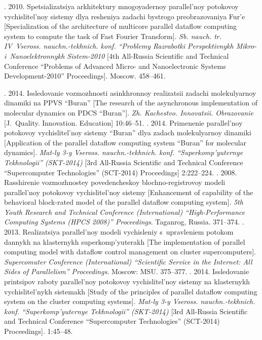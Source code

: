 \begin{multicols}{2}
{{\begin{thebibliography}{99}
  . 2010. Spetsia\-li\-za\-tsiya arkhitektury 
mnogoyadernoy parallel'noy potokovoy vychislitel'noy sistemy dlya resheniya 
zadachi bystrogo preobrazovaniya Fur'e [Specialization of the architecture of 
multicore parallel dataflow computing system to compute the task of Fast Fourier 
Transform]. \textit{Sb. nauch. tr. IV~Vseross. nauchn.-tekhnich. konf. ``Problemy 
Razrabotki Perspektivnykh Mikro- i~Nanoelektronnykh Sistem-2010} [4th  
All-Russia Scientific and Technical Conference ``Problems of Advanced Micro- and 
Nanoelectronic Systems Development-2010'' Proceedings]. Moscow. 458--461.

  . 2014. Issledovanie vozmozhnosti asinkhronnoy realizatsii 
zadachi mo\-le\-ku\-lyar\-noy dinamiki na PPVS ``Buran'' [The research of the 
asynchronous implementation of molecular dynamics on PDCS ``Buran'']. \textit{Zh. 
Kachestvo. Innovatsii. Obrazovanie} [J.~Quality. Innovation. Education] 10:46--51.
  . 
2014. Primenenie parallel'noy potokovoy vychislitel'noy sistemy ``Buran'' dlya 
zadach moleku\-lyar\-noy dinamiki [Application of the parallel dataflow computing 
system ``Buran'' for molecular dynamics]. \textit{Mat-ly 3-y Vseross.  
nauchn.-tekhnich. konf. ``Superkomp'yuternye Tekhnologii'' (SKT-2014)} [3rd All-Russia
Scientific and Technical Conference  ``Supercomputer Technologies''  
(SCT-2014) Proceedings] 2:222--224.
  . 2008. Rasshirenie 
vozmozhnostey povedencheskoy blochno-registrovoy modeli parallel'noy potokovoy 
vychislitel'noy sistemy [Enhancement of capability of the behavioral block-rated 
model of the parallel dataflow computing system]. \textit{5th 
Youth Research and Technical Conference 
(International) ``High-Performance Computing Systems (HPCS 2008)'' 
Proceedings}. Taganrog, Russia. 371--374.
  . 
2013. Realizatsiya pa\-ral\-lel'\-noy modeli vychisleniy s~upravleniem potokom dannykh 
na klasternykh superkomp'yuterakh [The implementation of parallel computing 
model with dataflow control management on cluster supercomputers]. 
\textit{Supercomuter 
Conference (International) ``Scientific Service in the Internet: All Sides of Parallelism'' 
Proceedings}. Moscow: MSU. 375--377.
  . 2014. Is\-sle\-do\-va\-nie 
prin\-tsi\-pov raboty pa\-ral\-lel'\-noy potokovoy vy\-chis\-li\-tel'\-noy sistemy 
na klas\-ter\-nykh 
vy\-chis\-li\-tel'\-nykh sis\-te\-makh [Study of the principles of parallel dataflow computing 
system on the cluster computing systems]. \textit{Mat-ly 3-y Vseross.  
nauchn.-tekhnich. konf. ``Superkomp'yuternye Tekhnologii'' (SKT-2014)} [3rd All-Russia
Scientific and Technical Conference  ``Supercomputer Technologies'' 
(SCT-2014) Proceedings]. 1:45--48.
\end{thebibliography}

}}
\end{multicols}
